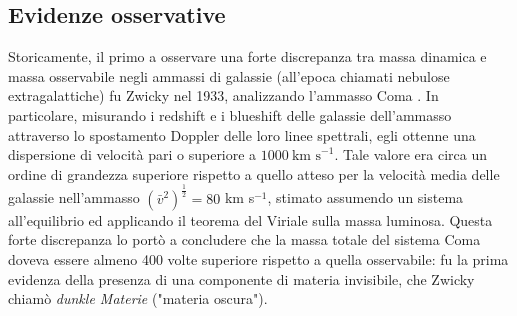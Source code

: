 \subsection{Evidenze osservative}
Storicamente, il primo a osservare una forte discrepanza tra massa dinamica e massa osservabile negli ammassi di galassie (all'epoca chiamati nebulose extragalattiche) fu Zwicky nel 1933, analizzando l'ammasso Coma \parencite{Zwicky1933}. In particolare, misurando i redshift e i blueshift delle galassie dell'ammasso attraverso lo spostamento Doppler delle loro linee spettrali, egli ottenne una dispersione di velocità pari o superiore a $1000\ \text{km s}^{-1}$. Tale valore era circa un ordine di grandezza superiore rispetto a quello atteso per la velocità media delle galassie nell'ammasso $(\bar{v}^2)^{\frac{1}{2}}=80$ km s$^{-1}$, stimato assumendo un sistema all'equilibrio ed applicando il teorema del Viriale sulla massa luminosa. Questa forte discrepanza lo portò a concludere che la massa totale del sistema Coma doveva essere almeno 400 volte superiore rispetto a quella osservabile: fu la prima evidenza della presenza di una componente di materia invisibile, che Zwicky chiamò \textit{dunkle Materie} ("materia oscura").

